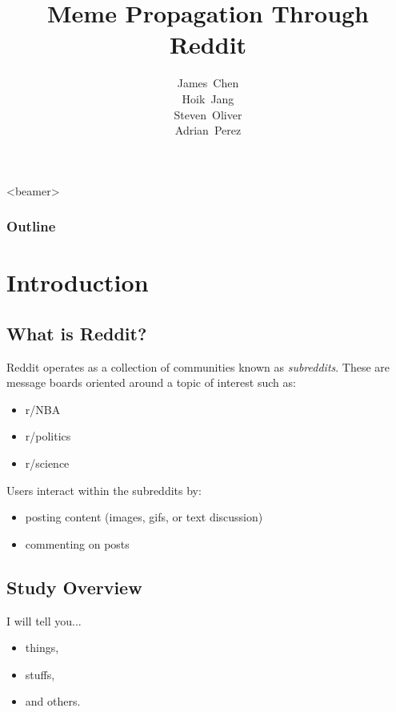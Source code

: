 \documentclass{beamer}
\title[Meme Propagation]{Meme Propagation Through Reddit}
\author[AUTHOR]{James~Chen \\ Hoik~Jang \\ Steven~Oliver \\ Adrian~Perez}
\institute
{
  Department of Physics and Astronomy \\ Department of Economics
}
\begin{document}

\begin{frame}
 \titlepage
\end{frame}

\begin{frame}<beamer>
  \frametitle{Outline}
  \tableofcontents
\end{frame}

\section{Introduction}

\subsection{What is Reddit?}

\begin{frame}

Reddit operates as a collection of communities known as \textit{subreddits}.
These are message boards oriented around a topic of interest such as:
\begin{itemize}
\item r/NBA
\item r/politics
\item r/science
\end{itemize}
Users interact within the subreddits by:
\begin{itemize}
\item posting content (images, gifs, or text discussion)
\item commenting on posts
\end{itemize}
\end{frame}





\begin{frame}
\subsection{Study Overview}


I will tell you...

    \begin{itemize}
    \item things,
    \item stuffs,
    \item and \alert{others}.
    \end{itemize}

\end{frame}
\end{document}

